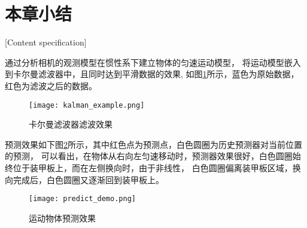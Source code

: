 \section{本章小结}[Content specification]

通过分析相机的观测模型在惯性系下建立物体的匀速运动模型，
将运动模型嵌入到卡尔曼滤波器中，且同时达到平滑数据的效果, 如图\ref{滤波}所示，蓝色为原始数据，红色为滤波之后的数据。

\begin{figure}[H]
    \centering
    \texttt{[image: kalman\_example.png]} 
    \caption{卡尔曼滤波器滤波效果}
    \label{滤波} 
\end{figure}    

预测效果如下图\ref{预测效果}所示，其中红色点为预测点，白色圆圈为历史预测器对当前位置的预测，
可以看出，在物体从右向左匀速移动时，预测器效果很好，白色圆圈始终位于装甲板上，而在左侧换向时，由于非线性，
白色圆圈偏离装甲板区域，换向完成后，白色圆圈又逐渐回到装甲板上。
\begin{figure}[H]
    \centering
    \texttt{[image: predict\_demo.png]} 
    \caption{运动物体预测效果}
    \label{预测效果} 
\end{figure}    